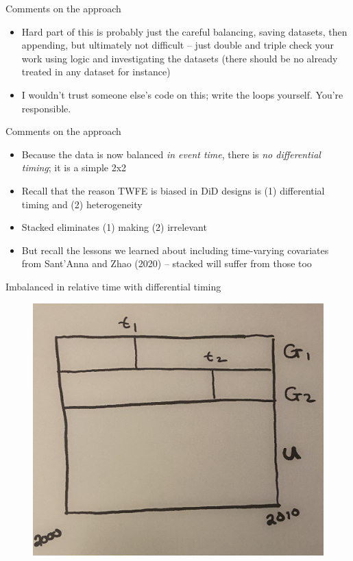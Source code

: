 \documentclass{beamer}
\begin{document}
\begin{frame}{Comments on the approach}

\begin{itemize}
\item Hard part of this is probably just the careful balancing, saving datasets, then appending, but ultimately not difficult -- just double and triple check your work using logic and investigating the datasets (there should be no already treated in any dataset for instance)
\item I wouldn't trust someone else's code on this; write the loops yourself. You're responsible.
\end{itemize}

\end{frame}

\begin{frame}{Comments on the approach}

\begin{itemize}
\item Because the data is now balanced \emph{in event time}, there is \emph{no differential timing}; it is a simple 2x2
\item Recall that the reason TWFE is biased in DiD designs is (1) differential timing and (2) heterogeneity
\item Stacked eliminates (1) making (2) irrelevant
\item But recall the lessons we learned about including time-varying covariates from Sant'Anna and Zhao (2020) -- stacked will suffer from those too
\end{itemize}

\end{frame}



\begin{frame}{Imbalanced in relative time with differential timing}

	\begin{figure}
	\includegraphics[scale=0.1]{./lecture_includes/stacked1.jpg}
	\end{figure}

\end{frame}
\end{document}
